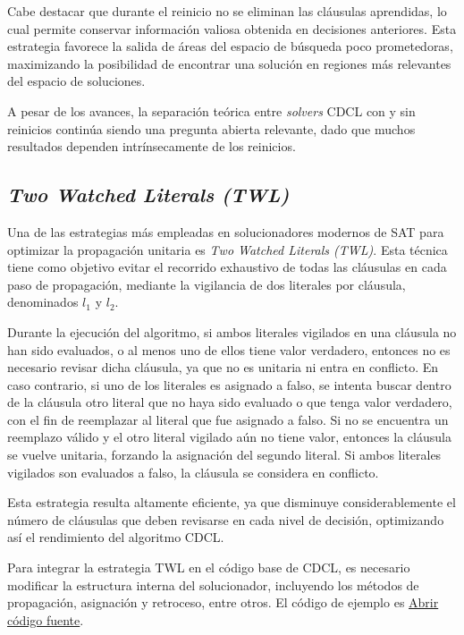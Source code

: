 Cabe destacar que durante el reinicio no se eliminan las cláusulas aprendidas, lo cual permite conservar información valiosa obtenida en decisiones anteriores. Esta estrategia favorece la salida de áreas del espacio de búsqueda poco prometedoras, maximizando la posibilidad de encontrar una solución en regiones más relevantes del espacio de soluciones.

A pesar de los avances, la separación teórica entre \textit{solvers} CDCL con y sin reinicios continúa siendo una pregunta abierta relevante, dado que muchos resultados dependen intrínsecamente de los reinicios. %

\subsection{\textit{Two Watched Literals (TWL)}}
\label{subsec:twl}

Una de las estrategias m\'as empleadas en solucionadores modernos de SAT para optimizar la propagaci\'on unitaria es \textit{Two Watched Literals (TWL)}. Esta t\'ecnica tiene como objetivo evitar el recorrido exhaustivo de todas las cl\'ausulas en cada paso de propagaci\'on, mediante la vigilancia de dos literales por cl\'ausula, denominados $l_1$ y $l_2$.

Durante la ejecuci\'on del algoritmo, si ambos literales vigilados en una cl\'ausula no han sido evaluados, o al menos uno de ellos tiene valor verdadero, entonces no es necesario revisar dicha cl\'ausula, ya que no es unitaria ni entra en conflicto. En caso contrario, si uno de los literales es asignado a falso, se intenta buscar dentro de la cl\'ausula otro literal que no haya sido evaluado o que tenga valor verdadero, con el fin de reemplazar al literal que fue asignado a falso. Si no se encuentra un reemplazo v\'alido y el otro literal vigilado a\'un no tiene valor, entonces la cl\'ausula se vuelve unitaria, forzando la asignaci\'on del segundo literal. Si ambos literales vigilados son evaluados a falso, la cl\'ausula se considera en conflicto.

Esta estrategia resulta altamente eficiente, ya que disminuye considerablemente el n\'umero de cl\'ausulas que deben revisarse en cada nivel de decisi\'on, optimizando as\'i el rendimiento del algoritmo CDCL.

Para integrar la estrategia TWL en el c\'odigo base de CDCL, es necesario modificar la estructura interna del solucionador, incluyendo los m\'etodos de propagaci\'on, asignaci\'on y retroceso, entre otros. El c\'odigo de ejemplo es \href{Graphics/dpll\_cdcl\_twl\_sat\_solver.py}{Abrir c\'odigo fuente}.

